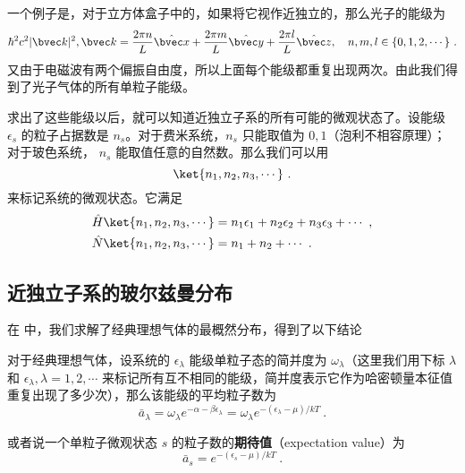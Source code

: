 一个例子是，对于立方体盒子中的，如果将它视作近独立的，那么光子的能级为
\begin{equation}
\hbar^2c^2 |\bvec k|^2,\bvec k=\frac{2\pi n}{L}\hat{\bvec x}+\frac{2\pi m}{L}\hat{\bvec y}+\frac{2\pi l}{L}\hat{\bvec z},\quad n,m,l\in \{0,1,2,\cdots\}~.
\end{equation}
又由于电磁波有两个偏振自由度，所以上面每个能级都重复出现两次。由此我们得到了光子气体的所有单粒子能级。

求出了这些能级以后，就可以知道近独立子系的所有可能的微观状态了。设能级 $\epsilon_s$ 的粒子占据数是 $n_s$。对于费米系统，$n_s$ 只能取值为 $0,1$（泡利不相容原理）；对于玻色系统， $n_s$ 能取值任意的自然数。那么我们可以用
\begin{equation}
\ket{n_1,n_2,n_3,\cdots}~.
\end{equation}
来标记系统的微观状态。它满足
\begin{equation}
\begin{aligned}
&\hat H\ket{n_1,n_2,n_3,\cdots} = n_1 \epsilon_1 +n_2\epsilon_2 + n_3 \epsilon_3 + \cdots~,\\
&\hat N\ket{n_1,n_2,n_3,\cdots} =n_1+n_2+\cdots ~.
\end{aligned}
\end{equation}




\subsection{近独立子系的玻尔兹曼分布}
在 中，我们求解了经典理想气体的最概然分布，得到了以下结论
\begin{theorem}{}
对于经典理想气体，设系统的 $\epsilon_\lambda$ 能级单粒子态的简并度为 $\omega_\lambda$（这里我们用下标 $\lambda$ 和 $\epsilon_\lambda,\lambda=1,2,\cdots$ 来标记所有互不相同的能级，简并度表示它作为哈密顿量本征值重复出现了多少次），那么该能级的平均粒子数为
\begin{equation}
\bar a_\lambda = \omega_\lambda e^{-\alpha-\beta\epsilon_\lambda}=
\omega_\lambda e^{-(\epsilon_\lambda-\mu)/kT}~.
\end{equation}


或者说一个单粒子微观状态 $s$ 的粒子数的\textbf{期待值}（expectation value）为
\begin{equation}
\bar a_s= e^{-(\epsilon_s-\mu)/kT}~.
\end{equation}
\end{theorem}

